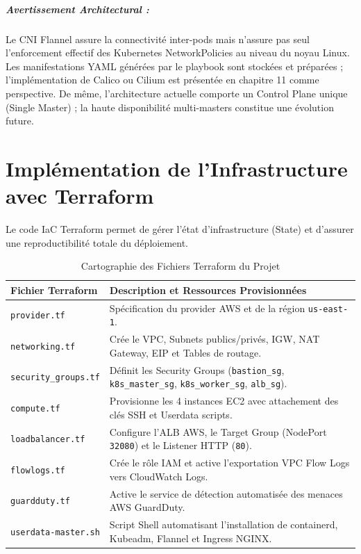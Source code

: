 \documentclass[12pt,a4paper]{report}
\begin{document}
\paragraph{Avertissement Architectural :} Le CNI Flannel assure la connectivité inter-pods mais n'assure pas seul l'enforcement effectif des Kubernetes NetworkPolicies au niveau du noyau Linux. Les manifestations YAML générées par le playbook sont stockées et préparées ; l'implémentation de Calico ou Cilium est présentée en chapitre 11 comme perspective. De même, l'architecture actuelle comporte un Control Plane unique (Single Master) ; la haute disponibilité multi-masters constitue une évolution future.

\chapter{Implémentation de l'Infrastructure avec Terraform}
Le code IaC Terraform permet de gérer l'état d'infrastructure (State) et d'assurer une reproductibilité totale du déploiement.

\begin{table}[H]
\centering
\caption{Cartographie des Fichiers Terraform du Projet}
\label{tab:terraform}
\begin{tabularx}{\textwidth}{lX}
\toprule
\textbf{Fichier Terraform} & \textbf{Description et Ressources Provisionnées} \\
\midrule
\texttt{provider.tf} & Spécification du provider AWS et de la région \texttt{us-east-1}. \\
\texttt{networking.tf} & Crée le VPC, Subnets publics/privés, IGW, NAT Gateway, EIP et Tables de routage. \\
\texttt{security\_groups.tf} & Définit les Security Groups (\texttt{bastion\_sg}, \texttt{k8s\_master\_sg}, \texttt{k8s\_worker\_sg}, \texttt{alb\_sg}). \\
\texttt{compute.tf} & Provisionne les 4 instances EC2 avec attachement des clés SSH et Userdata scripts. \\
\texttt{loadbalancer.tf} & Configure l'ALB AWS, le Target Group (NodePort \texttt{32080}) et le Listener HTTP (\texttt{80}). \\
\texttt{flowlogs.tf} & Crée le rôle IAM et active l'exportation VPC Flow Logs vers CloudWatch Logs. \\
\texttt{guardduty.tf} & Active le service de détection automatisée des menaces AWS GuardDuty. \\
\texttt{userdata-master.sh} & Script Shell automatisant l'installation de containerd, Kubeadm, Flannel et Ingress NGINX. \\
\bottomrule
\end{tabularx}
\end{table}
\end{document}

